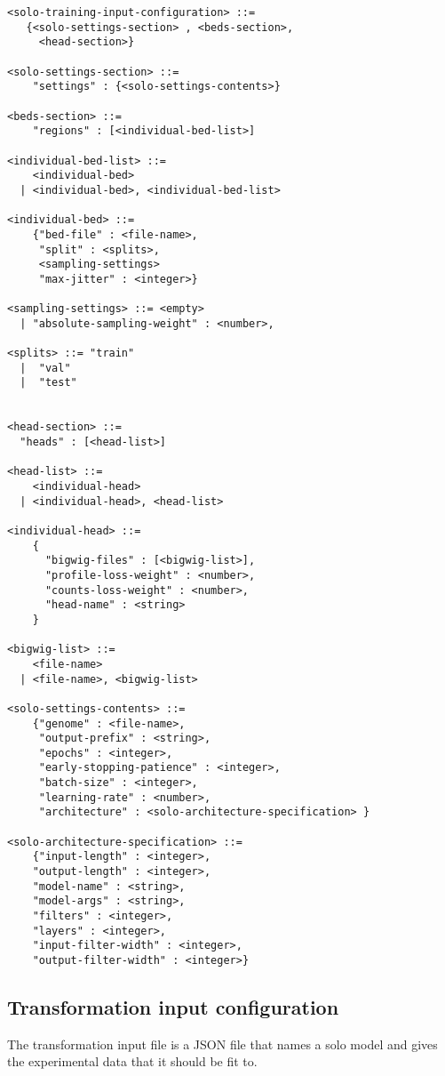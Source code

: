 \documentclass{article}
\begin{document}
\begin{lstlisting}
<solo-training-input-configuration> ::= 
   {<solo-settings-section> , <beds-section>, 
     <head-section>}

<solo-settings-section> ::= 
    "settings" : {<solo-settings-contents>}

<beds-section> ::= 
    "regions" : [<individual-bed-list>]

<individual-bed-list> ::= 
    <individual-bed> 
  | <individual-bed>, <individual-bed-list>

<individual-bed> ::= 
    {"bed-file" : <file-name>,
     "split" : <splits>,
     <sampling-settings>
     "max-jitter" : <integer>}

<sampling-settings> ::= <empty>
  | "absolute-sampling-weight" : <number>,

<splits> ::= "train"
  |  "val" 
  |  "test"


<head-section> ::= 
  "heads" : [<head-list>]

<head-list> ::= 
    <individual-head>
  | <individual-head>, <head-list>

<individual-head> ::=
    {
      "bigwig-files" : [<bigwig-list>],
      "profile-loss-weight" : <number>,
      "counts-loss-weight" : <number>,
      "head-name" : <string>
    }

<bigwig-list> ::=
    <file-name> 
  | <file-name>, <bigwig-list>

<solo-settings-contents> ::= 
    {"genome" : <file-name>, 
     "output-prefix" : <string>, 
     "epochs" : <integer>, 
     "early-stopping-patience" : <integer>, 
     "batch-size" : <integer>, 
     "learning-rate" : <number>, 
     "architecture" : <solo-architecture-specification> } 

<solo-architecture-specification> ::= 
    {"input-length" : <integer>, 
    "output-length" : <integer>,
    "model-name" : <string>,
    "model-args" : <string>,
    "filters" : <integer>,
    "layers" : <integer>,
    "input-filter-width" : <integer>,
    "output-filter-width" : <integer>}
\end{lstlisting}
                    

\subsection{Transformation input configuration}
The transformation input file is a JSON file that names a solo model and gives the experimental data that it should be fit to. 
\end{document}
